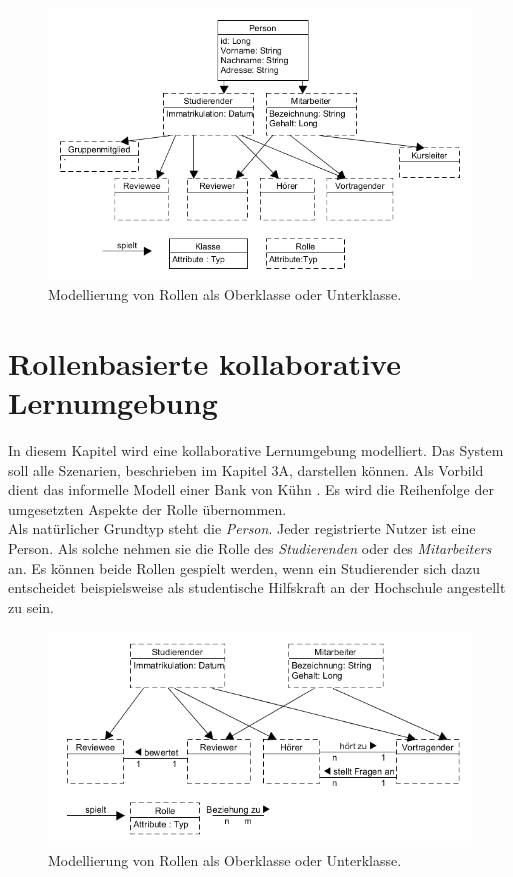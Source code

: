 \documentclass[conference]{IEEEtran}
\begin{document}
\begin{figure}
\includegraphics[scale=0.4]{Images/collabLearningBehavorial.PNG}
\caption{Modellierung von Rollen als Oberklasse oder Unterklasse.}
\end{figure}
\section{Rollenbasierte kollaborative Lernumgebung}
In diesem Kapitel wird eine kollaborative Lernumgebung modelliert. Das System soll alle Szenarien, beschrieben im Kapitel 3A, darstellen können. Als Vorbild dient das informelle Modell einer Bank von Kühn \cite{family}. Es wird die Reihenfolge der umgesetzten Aspekte der Rolle übernommen. \\Als natürlicher Grundtyp steht die \textit{Person}. Jeder registrierte Nutzer ist eine Person. Als solche nehmen sie die Rolle des \textit{Studierenden} oder des \textit{Mitarbeiters} an. Es können beide Rollen gespielt werden, wenn ein Studierender sich dazu entscheidet beispielsweise als studentische Hilfskraft an der Hochschule angestellt zu sein.


\begin{figure}
\includegraphics[scale=0.4]{Images/collabLearningRelations.PNG}
\caption{Modellierung von Rollen als Oberklasse oder Unterklasse.}
\end{figure}
\end{document}
